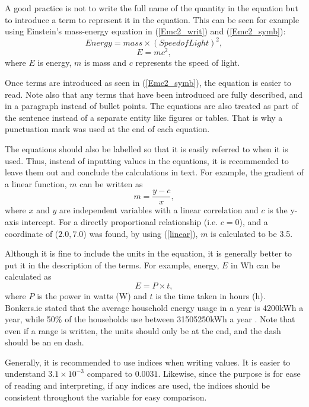 A good practice is not to write the full name of the quantity in the equation but to introduce a term to represent it in the equation. This can be seen for example using Einstein's mass-energy equation in (\ref{Emc2_writ}) and (\ref{Emc2_symb}):
\begin{equation}\label{Emc2_writ}
    Energy = mass \times \left(Speed of Light\right)^2,
\end{equation}
\begin{equation}\label{Emc2_symb}
    E = mc^2,
\end{equation}
where $E$ is energy, $m$ is mass and $c$ represents the speed of light. 

Once terms are introduced as seen in (\ref{Emc2_symb}), the equation is easier to read. Note also that any terms that have been introduced are fully described, and in a paragraph instead of bullet points. The equations are also treated as part of the sentence instead of a separate entity like figures or tables. That is why a punctuation mark was used at the end of each equation. 

The equations should also be labelled so that it is easily referred to when it is used. Thus, instead of inputting values in the equations, it is recommended to leave them out and conclude the calculations in text. For example, the gradient of a linear function, $m$ can be written as
\begin{equation} \label{linear}
    m=\frac{y-c}{x},
\end{equation}
where $x$ and $y$ are independent variables with a linear correlation and $c$ is the y-axis intercept. For a directly proportional relationship (i.e. $c=0$), and a coordinate of ($2.0,7.0$) was found, by using (\ref{linear}), $m$ is calculated to be 3.5. 

Although it is fine to include the units in the equation, it is generally better to put it in the description of the terms. For example, energy, $E$ in Wh can be calculated as
\begin{equation}
    E = P\times t,
\end{equation}
where $P$ is the power in watts (W) and \(t\) is the time taken in hours (h). Bonkers.ie stated that the average household energy usage in a year is 4200kWh a year, while 50\% of the households use between 3150\textendash5250kWh a year \cite{Energy_IRELAND}. Note that even if a range is written, the units should only be at the end, and the dash should be an en dash. 

Generally, it is recommended to use indices when writing values. It is easier to understand $3.1\times10^{-3}$ compared to $0.0031$. Likewise, since the purpose is for ease of reading and interpreting, if any indices are used, the indices should be consistent throughout the variable for easy comparison.  

